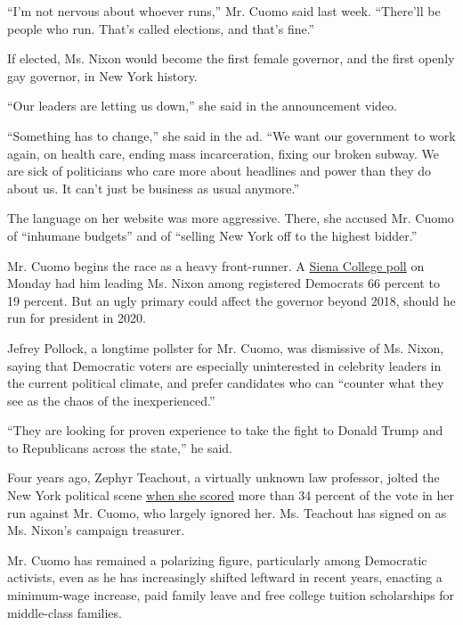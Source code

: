``I'm not nervous about whoever runs,'' Mr. Cuomo said last week.
``There'll be people who run. That's called elections, and that's
fine.''

If elected, Ms. Nixon would become the first female governor, and the
first openly gay governor, in New York history.

``Our leaders are letting us down,'' she said in the announcement video.

``Something has to change,'' she said in the ad. ``We want our
government to work again, on health care, ending mass incarceration,
fixing our broken subway. We are sick of politicians who care more about
headlines and power than they do about us. It can't just be business as
usual anymore.''

The language on her website was more aggressive. There, she accused Mr.
Cuomo of ``inhumane budgets'' and of ``selling New York off to the
highest bidder.''

Mr. Cuomo begins the race as a heavy front-runner. A
\href{https://www.nytimes3xbfgragh.onion/2018/03/19/nyregion/cuomo-leads-cynthia-nixon-and-gop-hopefuls-in-2018-re-election-poll.html}{Siena
College poll} on Monday had him leading Ms. Nixon among registered
Democrats 66 percent to 19 percent. But an ugly primary could affect the
governor beyond 2018, should he run for president in 2020.

Jefrey Pollock, a longtime pollster for Mr. Cuomo, was dismissive of Ms.
Nixon, saying that Democratic voters are especially uninterested in
celebrity leaders in the current political climate, and prefer
candidates who can ``counter what they see as the chaos of the
inexperienced.''

``They are looking for proven experience to take the fight to Donald
Trump and to Republicans across the state,'' he said.

Four years ago, Zephyr Teachout, a virtually unknown law professor,
jolted the New York political scene
\href{https://www.nytimes3xbfgragh.onion/2014/09/10/nyregion/cuomo-and-hochul-win-new-york-primary.html}{when
she scored} more than 34 percent of the vote in her run against Mr.
Cuomo, who largely ignored her. Ms. Teachout has signed on as Ms.
Nixon's campaign treasurer.

Mr. Cuomo has remained a polarizing figure, particularly among
Democratic activists, even as he has increasingly shifted leftward in
recent years, enacting a minimum-wage increase, paid family leave and
free college tuition scholarships for middle-class families.

